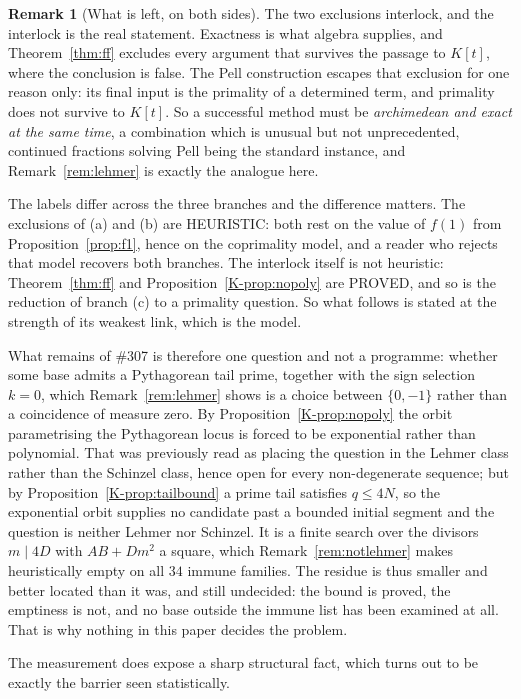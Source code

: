 \documentclass[11pt]{article}
\theoremstyle{definition}
\newtheorem{remark}[theorem]{Remark}
\begin{document}
\begin{remark}[What is left, on both sides]
The two exclusions interlock, and the interlock is the real statement. Exactness is what algebra
supplies, and Theorem~\ref{thm:ff} excludes every argument that survives the passage to $K[t]$,
where the conclusion is false. The Pell construction escapes that exclusion for one reason only:
its final input is the primality of a determined term, and primality does not survive to $K[t]$. So a
successful method must be \emph{archimedean and exact at the same time}, a combination which is
unusual but not unprecedented, continued fractions solving Pell being the standard instance, and
Remark~\ref{rem:lehmer} is exactly the analogue here.

The labels differ across the three branches and the difference matters. The exclusions of (a) and
(b) are \textup{HEURISTIC}: both rest on the value of $f(1)$ from Proposition~\ref{prop:f1}, hence on
the coprimality model, and a reader who rejects that model recovers both branches. The interlock
itself is not heuristic: Theorem~\ref{thm:ff} and Proposition~\ref{K-prop:nopoly} are
\textup{PROVED}, and so is the reduction of branch (c) to a primality question. So what follows is
stated at the strength of its weakest link, which is the model.

What remains of \#307 is therefore one question and not a programme: whether some base admits a
Pythagorean tail prime, together with the sign selection $k=0$, which Remark~\ref{rem:lehmer} shows
is a choice between $\{0,-1\}$ rather than a coincidence of measure zero. By
Proposition~\ref{K-prop:nopoly} the orbit parametrising the Pythagorean locus is forced to be
exponential rather than polynomial. That was previously read as placing the question in the Lehmer
class rather than the Schinzel class, hence open for every non-degenerate sequence; but by
Proposition~\ref{K-prop:tailbound} a prime tail satisfies $q\le4N$, so the exponential orbit supplies
no candidate past a bounded initial segment and the question is neither Lehmer nor Schinzel. It is a
finite search over the divisors $m\mid4D$ with $AB+Dm^2$ a square, which
Remark~\ref{rem:notlehmer} makes heuristically empty on all $34$ immune families. The residue is
thus smaller and better located than it was, and still undecided: the bound is proved, the
emptiness is not, and no base outside the immune list has been examined at all. That is why nothing
in this paper decides the problem.
\end{remark}

The measurement does expose a sharp structural fact, which turns out to be exactly the barrier seen
statistically.
\end{document}
